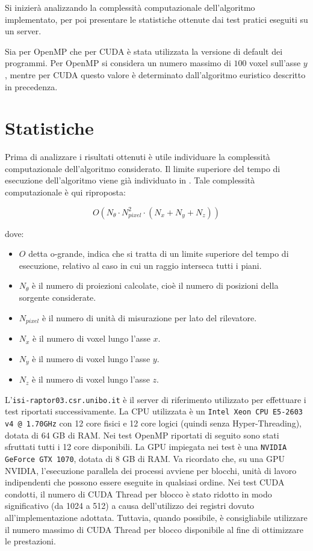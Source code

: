 \documentclass[12pt,a4paper]{report}
\begin{document}
Si inizierà analizzando la complessità computazionale dell'algoritmo implementato, per poi presentare le statistiche ottenute dai
test pratici eseguiti su un server.

Sia per OpenMP che per CUDA è stata utilizzata la versione di default dei programmi.
Per OpenMP si considera un numero massimo di \(100\) voxel sull'asse \(y\), mentre per CUDA questo valore è determinato
dall'algoritmo euristico descritto in precedenza.

\section{Statistiche}

Prima di analizzare i risultati ottenuti è utile individuare la complessità computazionale dell'algoritmo considerato.
Il limite superiore del tempo di esecuzione dell'algoritmo viene già individuato in \cite{Colletta2024}.
Tale complessità computazionale è qui riproposta:

\begin{equation} \label{eq:computational_complexity}
  O(N_\theta \cdot N_{pixel}^2 \cdot (N_x + N_y + N_z))
\end{equation}

dove:
\begin{itemize}
  \item \(O\) detta o-grande, indica che si tratta di un limite superiore del tempo di esecuzione, relativo al caso in cui un
        raggio interseca tutti i piani.
  \item \(N_\theta\) è il numero di proiezioni calcolate, cioè il numero di posizioni della sorgente considerate.
  \item \(N_{pixel}\) è il numero di unità di misurazione per lato del rilevatore.
  \item \(N_x\) è il numero di voxel lungo l'asse \(x\).
  \item \(N_y\) è il numero di voxel lungo l'asse \(y\).
  \item \(N_z\) è il numero di voxel lungo l'asse \(z\).
\end{itemize}

L'\mbox{\lstinline{isi-raptor03.csr.unibo.it}} è il server di riferimento utilizzato per effettuare i test riportati
successivamente.
La CPU utilizzata è un \lstinline{Intel Xeon CPU E5-2603 v4 @ 1.70GHz} con 12 core fisici e 12 core logici (quindi senza
Hyper-Threading), dotata di 64 GB di RAM.
Nei test OpenMP riportati di seguito sono stati sfruttati tutti i 12 core disponibili.
La GPU impiegata nei test è una \mbox{\lstinline{NVIDIA GeForce GTX 1070},} dotata di 8 GB di RAM.
Va ricordato che, su una GPU NVIDIA, l'esecuzione parallela dei processi avviene per blocchi, unità di lavoro indipendenti che
possono essere eseguite in qualsiasi ordine.
Nei test CUDA condotti, il numero di CUDA Thread per blocco è stato ridotto in modo significativo (da 1024 a 512) a causa
dell'utilizzo dei registri dovuto all'implementazione adottata.
Tuttavia, quando possibile, è consigliabile utilizzare il numero massimo di CUDA Thread per blocco disponibile al fine di
ottimizzare le prestazioni.
\end{document}
